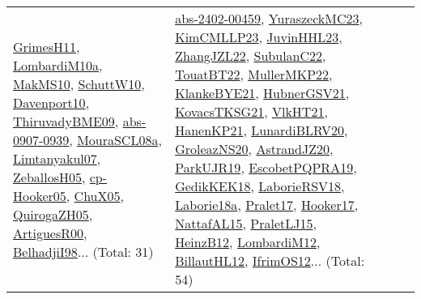 {\begin{longtable}{lp{3cm}>{\raggedright}p{6cm}>{\raggedright}p{6cm}p{8cm}}
\href{papers/GrimesH11.pdf}{GrimesH11}\cite{GrimesH11}, \href{articles/LombardiM10a.pdf}{LombardiM10a}\cite{LombardiM10a}, \href{papers/MakMS10.pdf}{MakMS10}\cite{MakMS10}, \href{papers/SchuttW10.pdf}{SchuttW10}\cite{SchuttW10}, \href{papers/Davenport10.pdf}{Davenport10}\cite{Davenport10}, \href{papers/ThiruvadyBME09.pdf}{ThiruvadyBME09}\cite{ThiruvadyBME09}, \href{articles/abs-0907-0939.pdf}{abs-0907-0939}\cite{abs-0907-0939}, \href{papers/MouraSCL08a.pdf}{MouraSCL08a}\cite{MouraSCL08a}, \href{papers/Limtanyakul07.pdf}{Limtanyakul07}\cite{Limtanyakul07}, \href{articles/ZeballosH05.pdf}{ZeballosH05}\cite{ZeballosH05}, \href{papers/cp-Hooker05.pdf}{cp-Hooker05}\cite{cp-Hooker05}, \href{papers/ChuX05.pdf}{ChuX05}\cite{ChuX05}, \href{papers/QuirogaZH05.pdf}{QuirogaZH05}\cite{QuirogaZH05}, \href{articles/ArtiguesR00.pdf}{ArtiguesR00}\cite{ArtiguesR00}, \href{articles/BelhadjiI98.pdf}{BelhadjiI98}\cite{BelhadjiI98}... (Total: 31) & \href{articles/abs-2402-00459.pdf}{abs-2402-00459}\cite{abs-2402-00459}, \href{papers/YuraszeckMC23.pdf}{YuraszeckMC23}\cite{YuraszeckMC23}, \href{papers/KimCMLLP23.pdf}{KimCMLLP23}\cite{KimCMLLP23}, \href{papers/JuvinHHL23.pdf}{JuvinHHL23}\cite{JuvinHHL23}, \href{papers/ZhangJZL22.pdf}{ZhangJZL22}\cite{ZhangJZL22}, \href{articles/SubulanC22.pdf}{SubulanC22}\cite{SubulanC22}, \href{papers/TouatBT22.pdf}{TouatBT22}\cite{TouatBT22}, \href{articles/MullerMKP22.pdf}{MullerMKP22}\cite{MullerMKP22}, \href{papers/KlankeBYE21.pdf}{KlankeBYE21}\cite{KlankeBYE21}, \href{articles/HubnerGSV21.pdf}{HubnerGSV21}\cite{HubnerGSV21}, \href{papers/KovacsTKSG21.pdf}{KovacsTKSG21}\cite{KovacsTKSG21}, \href{articles/VlkHT21.pdf}{VlkHT21}\cite{VlkHT21}, \href{papers/HanenKP21.pdf}{HanenKP21}\cite{HanenKP21}, \href{articles/LunardiBLRV20.pdf}{LunardiBLRV20}\cite{LunardiBLRV20}, \href{papers/GroleazNS20.pdf}{GroleazNS20}\cite{GroleazNS20}, \href{articles/AstrandJZ20.pdf}{AstrandJZ20}\cite{AstrandJZ20}, \href{papers/ParkUJR19.pdf}{ParkUJR19}\cite{ParkUJR19}, \href{articles/EscobetPQPRA19.pdf}{EscobetPQPRA19}\cite{EscobetPQPRA19}, \href{articles/GedikKEK18.pdf}{GedikKEK18}\cite{GedikKEK18}, \href{articles/LaborieRSV18.pdf}{LaborieRSV18}\cite{LaborieRSV18}, \href{papers/Laborie18a.pdf}{Laborie18a}\cite{Laborie18a}, \href{papers/Pralet17.pdf}{Pralet17}\cite{Pralet17}, \href{papers/Hooker17.pdf}{Hooker17}\cite{Hooker17}, \href{articles/NattafAL15.pdf}{NattafAL15}\cite{NattafAL15}, \href{papers/PraletLJ15.pdf}{PraletLJ15}\cite{PraletLJ15}, \href{papers/HeinzB12.pdf}{HeinzB12}\cite{HeinzB12}, \href{articles/LombardiM12.pdf}{LombardiM12}\cite{LombardiM12}, \href{papers/BillautHL12.pdf}{BillautHL12}\cite{BillautHL12}, \href{papers/IfrimOS12.pdf}{IfrimOS12}\cite{IfrimOS12}... (Total: 54)\\

\end{longtable}}
